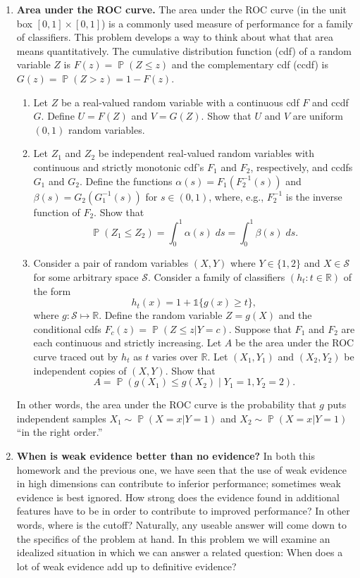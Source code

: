 \documentclass[11pt]{report}
\DeclareMathOperator{\Prob}{\mathbb{P}}
\newcommand{\ind}{{\mathds{1}}}
\begin{document}
\begin{enumerate}[1.]
	\item {\bf Area under the ROC curve.} The area under the ROC curve (in the unit box $[0,1]\times[0,1]$) is a commonly used measure of performance for a family of classifiers. This problem develops a way to think about what that area means quantitatively. The cumulative distribution function (cdf) of a random variable $Z$ is $F(z)=\Prob(Z\leq z)$ and the complementary cdf (ccdf) is $G(z)=\Prob(Z > z)=1-F(z)$.
	      \begin{enumerate}
		      \item Let $Z$ be a real-valued random variable with a continuous cdf $F$ and ccdf $G$.  Define $U=F(Z)$ and $V=G(Z)$. Show that $U$ and $V$ are uniform$(0,1)$ random variables.
		      \item Let $Z_1$ and $Z_2$ be independent real-valued random variables with continuous and strictly monotonic cdf's $F_1$ and $F_2$, respectively, and ccdfs $G_1$ and $G_2$. Define the functions $\alpha(s)=F_1(F_2^{-1}(s))$ and $\beta(s)=G_2(G_1^{-1}(s))$ for $s\in(0,1)$, where, e.g., $F_2^{-1}$ is the inverse function of $F_2$. Show that
		            \[ \textstyle \Prob(Z_1\leq Z_2) = \int_0^1 \alpha(s)\; ds = \int_0^1 \beta(s) \; ds . \]
		      \item  Consider a pair of random variables $(X,Y)$ where $Y\in\{1,2\}$ and $X\in\mathcal{S}$ for some arbitrary space $\mathcal{S}$. Consider a family of classifiers $(h_t: t\in\mathbb{R})$ of the form
		            \[ h_t(x) = 1 + \ind\{g(x)\geq t\} , \]
		            where $g:\mathcal{S}\mapsto\mathbb{R}$. Define the random variable $Z=g(X)$ and the conditional cdfs $F_c(z)=\Prob(Z\leq z|Y=c)$.  Suppose that $F_1$ and $F_2$ are each continuous and strictly increasing. Let $A$ be the area under the ROC curve traced out by $h_t$ as $t$ varies over $\mathbb{R}$. Let $(X_1,Y_1)$ and $(X_2,Y_2)$ be independent copies of $(X,Y)$. Show that
		            \[ A = \Prob(g(X_1)\leq g(X_2)\mid Y_1=1,Y_2=2) . \]
	      \end{enumerate}
	      In other words, the area under the ROC curve is the probability that $g$ puts independent samples $X_1\sim \Prob(X=x|Y=1)$ and $X_2 \sim \Prob(X=x|Y=1)$ ``in the right order.''

	      \pagebreak



	\item
	      {\bf When is weak evidence better than no evidence?} In both this homework and the previous one, we have seen that the use of weak evidence in high dimensions can contribute to inferior performance; sometimes weak evidence is best ignored. How strong does the evidence found in additional features have to be in order to contribute
	      to improved performance? In other words, where is the cutoff?
	      Naturally, any useable answer will come down to the specifics of the problem at hand. In this problem we will examine an idealized situation in which
	      we can answer a related question: When does a lot of weak evidence add up to definitive evidence?


\end{enumerate}
\end{document}
